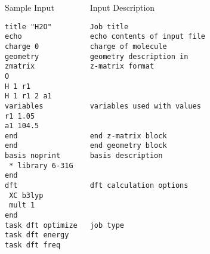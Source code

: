 \documentclass[slidestop,mathserif,compress,xcolor=svgnames]{beamer}
\begin{document}
\begin{frame}[fragile]
\tiny{
\begin{columns}
\column{6.5cm}
\begin{block}{Sample Input}
\begin{verbatim}
title "H2O"
echo
charge 0
geometry
zmatrix
O
H 1 r1
H 1 r1 2 a1
variables
r1 1.05 
a1 104.5
end
end
basis noprint
 * library 6-31G
end
dft
 XC b3lyp
 mult 1
end
task dft optimize
task dft energy
task dft freq
\end{verbatim}
\end{block}
\column{5cm}
{\color{tigersblue}
\begin{alertblock}{Input Description}
\begin{verbatim}
Job title
echo contents of input file
charge of molecule
geometry description in
z-matrix format



variables used with values
 

end z-matrix block
end geometry block
basis description
 
 
dft calculation options
 
 

job type


\end{verbatim}
\end{alertblock}
}
\end{columns}
}
\end{frame}
\end{document}
